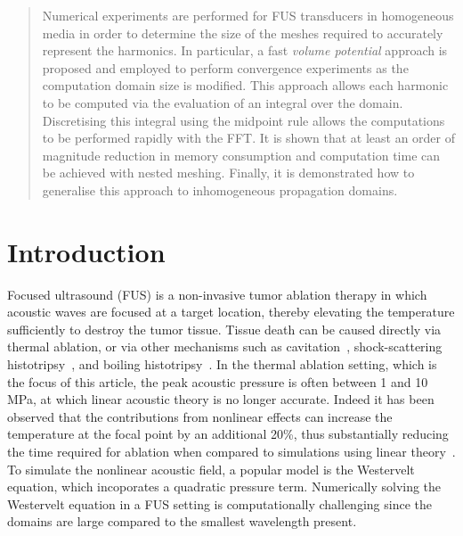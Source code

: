 \documentclass[11pt]{article}
\numberwithin{equation}{section}
\newcommand{\red}[1]{{\color{black} #1}}
\begin{document}
\begin{abstract}
    Numerical experiments are performed for \red{FUS} transducers in 
    homogeneous media in order to determine the size of the meshes 
    required to accurately represent the harmonics. In particular, a fast 
    \textit{volume potential} approach is proposed and employed to perform convergence
    experiments as the computation domain size is modified. This approach allows each harmonic to 
    be computed via the evaluation of an integral over the domain. Discretising this 
    integral using the midpoint rule allows the computations to be performed 
    rapidly with the FFT. It is shown that at least an order of magnitude 
    reduction in memory consumption and computation time can be achieved with
    nested meshing. \red{Finally, it is demonstrated how to generalise this approach 
    to inhomogeneous propagation domains.}

\end{abstract}



\clearpage
\section{\label{sec:1} Introduction}
\red{Focused ultrasound (FUS)} is a non-invasive tumor ablation 
therapy in which acoustic waves are focused at a target location, thereby 
elevating the temperature sufficiently to destroy the tumor tissue. Tissue 
death can be caused directly via thermal ablation, or via other 
mechanisms such as cavitation~\cite{vlaisavljevich2013image,izadifar2017mechanical},
\red{shock-scattering histotripsy~\cite{maxwell2011cavitation}, and boiling histotripsy~\cite{khokhlova2011controlled}}. 
In the thermal ablation setting, which is the focus of this article, the peak acoustic 
pressure is often between 1 and 10 MPa, at which linear acoustic theory is no longer accurate. 
Indeed it has been observed that the contributions from nonlinear effects can
increase the temperature at the focal point by an additional 20\%,
thus substantially reducing the time required for ablation when compared to simulations
using linear theory~\cite{solovchuk2014temperature}.
To simulate the nonlinear 
acoustic field, a popular model is the Westervelt equation,
which incoporates a quadratic pressure term. Numerically solving the 
Westervelt equation in a \red{FUS} setting is computationally challenging since the
domains are large compared to the smallest wavelength present. 
\end{document}
